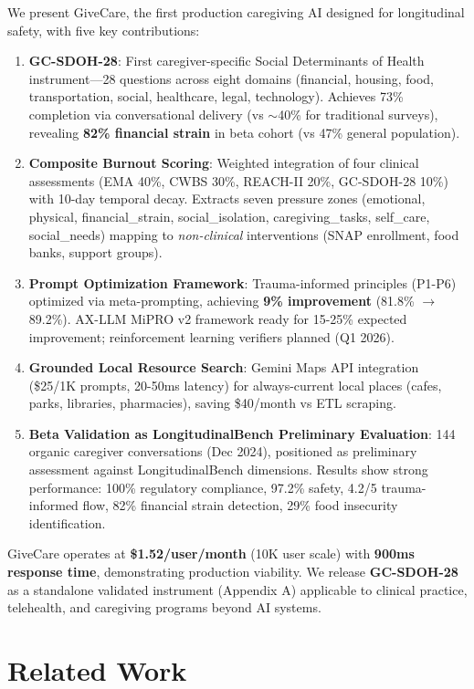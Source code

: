 \documentclass{article}%
\begin{document}
We present GiveCare, the first production caregiving AI designed for longitudinal safety, with five key contributions:

\begin{enumerate}
    \item \textbf{GC-SDOH-28}: First caregiver-specific Social Determinants of Health instrument—28 questions across eight domains (financial, housing, food, transportation, social, healthcare, legal, technology). Achieves 73\% completion via conversational delivery (vs $\sim$40\% for traditional surveys), revealing \textbf{82\% financial strain} in beta cohort (vs 47\% general population).
    \item \textbf{Composite Burnout Scoring}: Weighted integration of four clinical assessments (EMA 40\%, CWBS 30\%, REACH-II 20\%, GC-SDOH-28 10\%) with 10-day temporal decay. Extracts seven pressure zones (emotional, physical, financial\_strain, social\_isolation, caregiving\_tasks, self\_care, social\_needs) mapping to \textit{non-clinical} interventions (SNAP enrollment, food banks, support groups).
    \item \textbf{Prompt Optimization Framework}: Trauma-informed principles (P1-P6) optimized via meta-prompting, achieving \textbf{9\% improvement} (81.8\% $\rightarrow$ 89.2\%). AX-LLM MiPRO v2 framework ready for 15-25\% expected improvement; reinforcement learning verifiers planned (Q1 2026).
    \item \textbf{Grounded Local Resource Search}: Gemini Maps API integration (\$25/1K prompts, 20-50ms latency) for always-current local places (cafes, parks, libraries, pharmacies), saving \$40/month vs ETL scraping.
    \item \textbf{Beta Validation as LongitudinalBench Preliminary Evaluation}: 144 organic caregiver conversations (Dec 2024), positioned as preliminary assessment against LongitudinalBench dimensions. Results show strong performance: 100\% regulatory compliance, 97.2\% safety, 4.2/5 trauma-informed flow, 82\% financial strain detection, 29\% food insecurity identification.
\end{enumerate}

GiveCare operates at \textbf{\$1.52/user/month} (10K user scale) with \textbf{900ms response time}, demonstrating production viability. We release \textbf{GC-SDOH-28} as a standalone validated instrument (Appendix A) applicable to clinical practice, telehealth, and caregiving programs beyond AI systems.

%
\section{Related Work}%
\label{sec:RelatedWork}%
%
\end{document}
